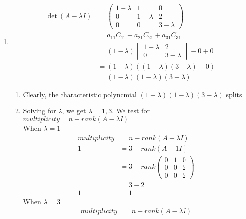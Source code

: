 \documentclass[13pt]{article}
\begin{document}
\begin{enumerate}[label=(\alph*),leftmargin=*]
\item
  \begin{align*}
    \det(A - \lambda I) &=
                          \begin{pmatrix}
                            1 - \lambda & 1 & 0 \\
                            0 & 1 - \lambda & 2 \\
                            0 & 0 & 3 - \lambda
                          \end{pmatrix} \\
                        &= a_{11}C_{11} - a_{21}C_{21} + a_{31}C_{31} \\
                        &= (1 - \lambda)
                          \begin{vmatrix}
                            1 - \lambda & 2 \\
                            0 & 3 - \lambda
                          \end{vmatrix} - 0 + 0 \\
                        &= (1 - \lambda)((1 - \lambda)(3 - \lambda) - 0) \\
                        &= (1 - \lambda)(1 - \lambda)(3 - \lambda)
  \end{align*}
  \begin{enumerate}
  \item Clearly, the characteristic polynomial $(1 - \lambda)(1 - \lambda)(3 - \lambda)$ splits
  \item Solving for $\lambda$, we get $\lambda = 1, 3$. We test for $multiplicity = n - rank(A - \lambda I)$ \\
    When $\lambda = 1$
    \begin{align*}
      multiplicity &= n - rank(A - \lambda I) \\
      1 &= 3 - rank(A - 1I) \\
                   &= 3 - rank
                     \begin{pmatrix}
                       0 & 1 & 0 \\
                       0 & 0 & 2 \\
                       0 & 0 & 2
                     \end{pmatrix} \\
                   &= 3 - 2 \\
      1 &= 1
    \end{align*}
    When $\lambda = 3$
    \begin{align*}
      multiplicity &= n - rank(A - \lambda I) \\

\end{align*}
\end{enumerate}
\end{enumerate}
\end{document}
